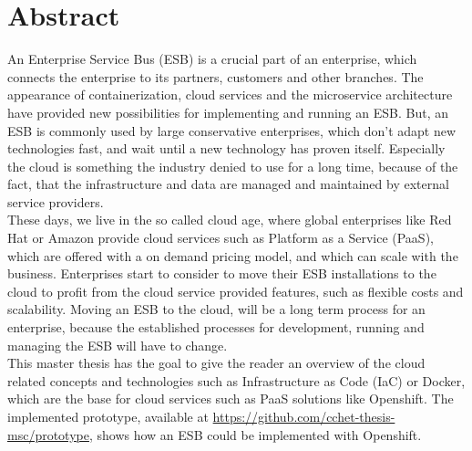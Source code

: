 \chapter{Abstract}
An Enterprise Service Bus (ESB) is a crucial part of an enterprise, which connects the enterprise to its partners, customers and other branches. The appearance of containerization, cloud services and the microservice architecture have provided new possibilities for implementing and running an ESB. But, an ESB is commonly used by large conservative enterprises, which don't adapt new technologies fast, and wait until a new technology has proven itself. Especially the cloud is something the industry denied to use for a long time, because of the fact, that the infrastructure and data are managed and maintained by external service providers. \\ 

These days, we live in the so called cloud age, where global enterprises like Red Hat or Amazon provide cloud services such as Platform as a Service (PaaS), which are offered with a on demand pricing model, and which can scale with the business. Enterprises start to consider to move their ESB installations to the cloud to profit from the cloud service provided features, such as flexible costs and scalability. Moving an ESB to the cloud, will be a long term process for an enterprise, because the established processes for development, running and managing the ESB will have to change. \\

This master thesis has the goal to give the reader an overview of the cloud related concepts and technologies such as Infrastructure as Code (IaC) or Docker, which are the base for cloud services such as PaaS solutions like Openshift. The implemented prototype, available at \url{https://github.com/cchet-thesis-msc/prototype}, shows how an ESB could be implemented with Openshift. \\


